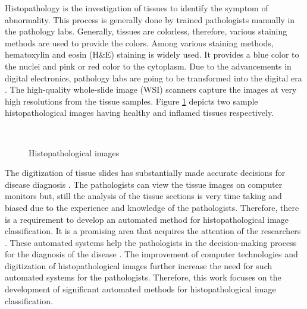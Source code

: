 Histopathology is the investigation of tissues to identify the symptom of abnormality. This process is generally done by trained pathologists manually in the pathology labs. Generally, tissues are colorless, therefore, various staining methods are used to provide the colors. Among various staining methods, hematoxylin and eosin (H\&E) staining is widely used. It provides a blue color to the nuclei and pink or red color to the cytoplasm. Due to the advancements in digital electronics, pathology labs are going to be transformed into the digital era \cite{stathonikos2013}. The high-quality whole-slide image (WSI) scanners capture the images at very high resolutions from the tissue samples.  Figure \ref{ch1:fig:HI} depicts two sample histopathological images having healthy and inflamed tissues respectively. 
\begin{figure}[h!]
            \begin{center}
            ~~~~~
 \end{center}
    \caption[Histopathological images]{Histopathological images \cite{srinivas2014}}
    \label{ch1:fig:HI}
\end{figure}
The digitization of tissue slides has substantially made accurate decisions for disease diagnosis \cite{srinivas2014}. The pathologists can view the tissue images on computer monitors but, still the analysis of the tissue sections is very time taking and biased due to the experience and knowledge of the pathologists. Therefore, there is a requirement to develop an automated method for histopathological image classification. It is a promising area that acquires the attention of the researchers \cite{gurcan2009}. These automated systems help the pathologists in the decision-making process for the diagnosis of the disease \cite{mccann2014}. The improvement of computer technologies and digitization of histopathological images further increase the need for such automated systems for the pathologists. Therefore, this work focuses on the development of significant automated methods for histopathological image classification.

